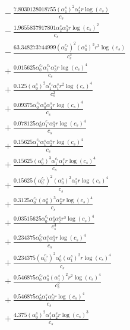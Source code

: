 \documentclass[10pt]{article}
\begin{document}
\begin{align*}
&{}  - \frac{7.8030128018755 \left(\alpha_{1}^s\right)^{2} \alpha_{2}^s r \log{\left(c_{s} \right)}}{c_{s}} \\
&{}  - \frac{1.9655837917801 \alpha_{2}^s \alpha_{3}^s r \log{\left(c_{s} \right)}^{2}}{c_{s}} \\
&{}  - \frac{63.348273744999 \left(\alpha_{0}^{c_s}\right)^{2} \left(\alpha_{0}^s\right)^{3} r^{3} \log{\left(c_{s} \right)}}{c_{s}^{3}} \\
&{}  + \frac{0.015625 \alpha_{0}^{c_s} \alpha_{1}^{c_s} \alpha_{3}^s r \log{\left(c_{s} \right)}^{4}}{c_{s}} \\
&{}  + \frac{0.125 \left(\alpha_{0}^s\right)^{2} \alpha_{1}^{c_s} \alpha_{1}^s r^{2} \log{\left(c_{s} \right)}^{4}}{c_{s}^{2}} \\
&{}  + \frac{0.09375 \alpha_{0}^{c_s} \alpha_{0}^s \alpha_{4}^s r \log{\left(c_{s} \right)}^{4}}{c_{s}} \\
&{}  + \frac{0.078125 \alpha_{0}^s \alpha_{1}^{c_s} \alpha_{3}^s r \log{\left(c_{s} \right)}^{4}}{c_{s}} \\
&{}  + \frac{0.15625 \alpha_{1}^{c_s} \alpha_{1}^s \alpha_{2}^s r \log{\left(c_{s} \right)}^{4}}{c_{s}} \\
&{}  + \frac{0.15625 \left(\alpha_{0}^s\right)^{3} \alpha_{1}^{c_s} \alpha_{1}^s r \log{\left(c_{s} \right)}^{4}}{c_{s}} \\
&{}  + \frac{0.15625 \left(\alpha_{0}^{c_s}\right)^{2} \left(\alpha_{0}^s\right)^{2} \alpha_{2}^s r \log{\left(c_{s} \right)}^{4}}{c_{s}} \\
&{}  + \frac{0.3125 \alpha_{0}^{c_s} \left(\alpha_{0}^s\right)^{3} \alpha_{2}^s r \log{\left(c_{s} \right)}^{4}}{c_{s}} \\
&{}  + \frac{0.03515625 \alpha_{0}^{c_s} \alpha_{0}^s \alpha_{2}^s r^{3} \log{\left(c_{s} \right)}^{4}}{c_{s}^{3}} \\
&{}  + \frac{0.234375 \alpha_{0}^{c_s} \alpha_{1}^s \alpha_{3}^s r \log{\left(c_{s} \right)}^{4}}{c_{s}} \\
&{}  + \frac{0.234375 \left(\alpha_{0}^{c_s}\right)^{2} \alpha_{0}^s \left(\alpha_{1}^s\right)^{2} r \log{\left(c_{s} \right)}^{4}}{c_{s}} \\
&{}  + \frac{0.546875 \alpha_{0}^{c_s} \alpha_{0}^s \left(\alpha_{1}^s\right)^{2} r^{2} \log{\left(c_{s} \right)}^{4}}{c_{s}^{2}} \\
&{}  + \frac{0.546875 \alpha_{0}^s \alpha_{1}^s \alpha_{3}^s r \log{\left(c_{s} \right)}^{4}}{c_{s}} \\
&{}  + \frac{4.375 \left(\alpha_{0}^s\right)^{2} \alpha_{1}^s \alpha_{2}^s r \log{\left(c_{s} \right)}^{3}}{c_{s}} \\

\end{align*}
\end{document}
